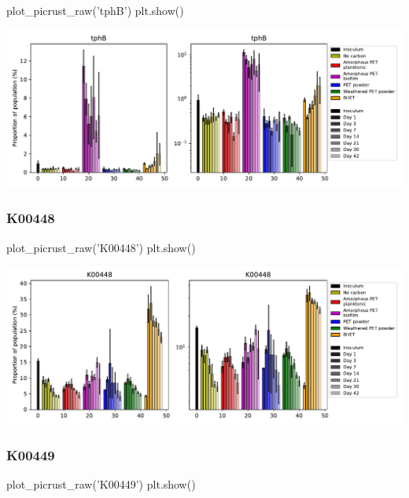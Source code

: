 \documentclass[
]{article}
\newenvironment{Shaded}{\begin{snugshade}}{\end{snugshade}}
\newcommand{\NormalTok}[1]{#1}
\newcommand{\StringTok}[1]{\textcolor[rgb]{0.31,0.60,0.02}{#1}}
\begin{document}
\begin{Shaded}
\begin{Highlighting}[]
\NormalTok{plot_picrust_raw(}\StringTok{'tphB'}\NormalTok{)}
\NormalTok{plt.show()}
\end{Highlighting}
\end{Shaded}

\includegraphics{20-6-15-PET-plastisphere-PICRUSt2_files/figure-latex/plot_raw_tphB-1.pdf}

\hypertarget{k00448}{%
\subsubsection{K00448}\label{k00448}}

\begin{Shaded}
\begin{Highlighting}[]
\NormalTok{plot_picrust_raw(}\StringTok{'K00448'}\NormalTok{)}
\NormalTok{plt.show()}
\end{Highlighting}
\end{Shaded}

\includegraphics{20-6-15-PET-plastisphere-PICRUSt2_files/figure-latex/plot_raw_K00448-1.pdf}

\hypertarget{k00449}{%
\subsubsection{K00449}\label{k00449}}

\begin{Shaded}
\begin{Highlighting}[]
\NormalTok{plot_picrust_raw(}\StringTok{'K00449'}\NormalTok{)}
\NormalTok{plt.show()}
\end{Highlighting}
\end{Shaded}
\end{document}
